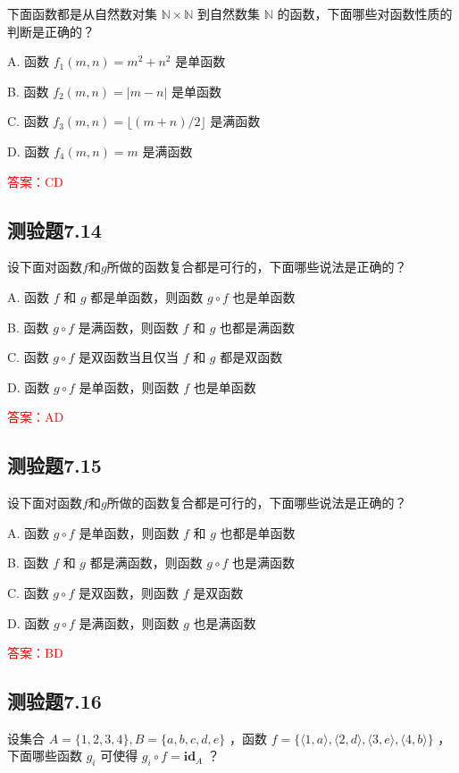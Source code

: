 \documentclass[UTF8, heading=true]{ctexart}
\begin{document}
下面函数都是从自然数对集 $\mathbb{N} \times \mathbb{N}$ 到自然数集 $\mathbb{N}$ 的函数，下面哪些对函数性质的判断是正确的？

A. 函数 $f_1(m, n)=m^2+n^2$ 是单函数

B. 函数 $f_2(m, n)=|m-n|$ 是单函数

C. 函数 $f_3(m, n)=\lfloor(m+n) / 2\rfloor$ 是满函数

D. 函数 $f_4(m, n)=m$ 是满函数

\textcolor{red}{答案：CD}

\subsection{测验题7.14}

设下面对函数$f$和$g$所做的函数复合都是可行的，下面哪些说法是正确的？

A. 函数 $f$ 和 $g$ 都是单函数，则函数 $g \circ f$ 也是单函数

B. 函数 $g \circ f$ 是满函数，则函数 $f$ 和 $g$ 也都是满函数

C. 函数 $g \circ f$ 是双函数当且仅当 $f$ 和 $g$ 都是双函数

D. 函数 $g \circ f$ 是单函数，则函数 $f$ 也是单函数

\textcolor{red}{答案：AD}

\subsection{测验题7.15}

设下面对函数$f$和$g$所做的函数复合都是可行的，下面哪些说法是正确的？

A. 函数 $g \circ f$ 是单函数，则函数 $f$ 和 $g$ 也都是单函数

B. 函数 $f$ 和 $g$ 都是满函数，则函数 $g \circ f$ 也是满函数

C. 函数 $g \circ f$ 是双函数，则函数 $f$ 是双函数

D. 函数 $g \circ f$ 是满函数，则函数 $g$ 也是满函数

\textcolor{red}{答案：BD}

\subsection{测验题7.16}

设集合 $A=\{1,2,3,4\}, B=\{a, b, c, d, e\}$ ，函数 $f=\{\langle 1, a\rangle,\langle 2, d\rangle,\langle 3, e\rangle,\langle 4, b\rangle\}$ ，下面哪些函数 $g_i$ 可使得 $g_i \circ f=\mathbf{i d}_A$ ？
\end{document}
